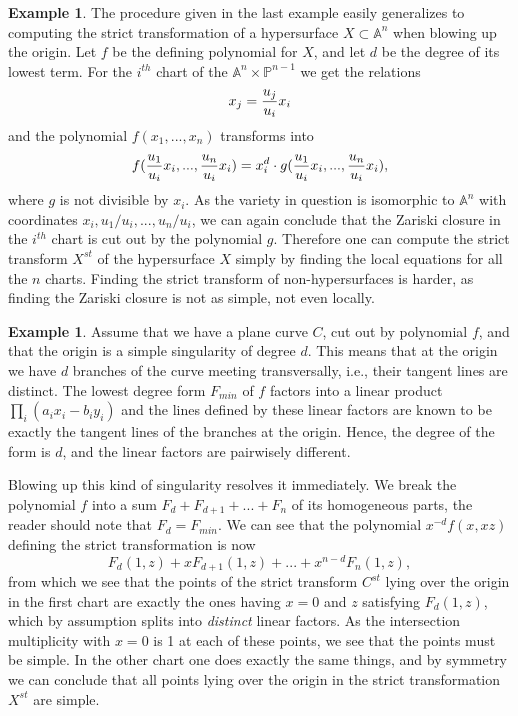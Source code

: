 \documentclass[12pt,a4paper,leqno]{article}
\newcommand{\Aff}{\mathbb{A}}
\newcommand{\Proj}{\mathbb{P}}
\theoremstyle{plain}
\theoremstyle{definition}
\newtheorem{ex}[theo]{Example}
\theoremstyle{remark}
\begin{document}
\begin{ex}
The procedure given in the last example easily generalizes to computing the strict transformation of a hypersurface $X \subset \Aff^n$ when blowing up the origin. Let $f$ be the defining polynomial for $X$, and let $d$ be the degree of its lowest term. For the $i^{th}$ chart of the $\Aff^{n} \times \Proj^{n-1}$ we get the relations 
\begin{equation*}
x_j = {u_j \over u_i} x_i  
\end{equation*}
and the polynomial $f(x_1,...,x_n)$ transforms into 
\begin{equation*}
f({u_1 \over u_i} x_i, ... ,{u_n \over u_i} x_i) = x_i^d \cdot g({u_1 \over u_i} x_i, ... ,{u_n \over u_i} x_i),
\end{equation*}
where $g$ is not divisible by $x_i$. As the variety in question is isomorphic to $\Aff^{n}$ with coordinates $x_i, u_1/u_i,...,u_n/u_i$, we can again conclude that the Zariski closure in the $i^{th}$ chart is cut out by the polynomial $g$. Therefore one can compute the strict transform $X^{st}$ of the hypersurface $X$ simply by finding the local equations for all the $n$ charts. Finding the strict transform of non-hypersurfaces is harder, as finding the Zariski closure is not as simple, not even locally.
\end{ex}

\begin{ex}
Assume that we have a plane curve $C$, cut out by polynomial $f$, and that the origin is a simple singularity of degree $d$. This means that at the origin we have $d$ branches of the curve meeting transversally, i.e., their tangent lines are distinct. The lowest degree form $F_{min}$ of $f$ factors into a linear product $\prod_i (a_i x_i - b_i y_i)$ and the lines defined by these linear factors are known to be exactly the tangent lines of the branches at the origin. Hence, the degree of the form is $d$, and the linear factors are pairwisely different.

Blowing up this kind of singularity resolves it immediately. We break the polynomial $f$ into a sum $F_d + F_{d+1} + ... + F_n$ of its homogeneous parts, the reader should note that $F_d = F_{min}$. We can see that the polynomial $x^{-d} f(x,xz)$ defining the strict transformation is now 
\begin{equation*}
F_d(1,z) + x F_{d+1} (1,z) + ... + x^{n-d} F_n (1,z),
\end{equation*}
from which we see that the points of the strict transform $C^{st}$ lying over the origin in the first chart are exactly the ones having $x=0$ and $z$ satisfying $F_d(1,z)$, which by assumption splits into \emph{distinct} linear factors. As the intersection multiplicity with $x=0$ is 1 at each of these points, we see that the points must be simple. In the other chart one does exactly the same things, and by symmetry we can conclude that all points lying over the origin in the strict transformation $X^{st}$ are simple.
\end{ex}
\end{document}
